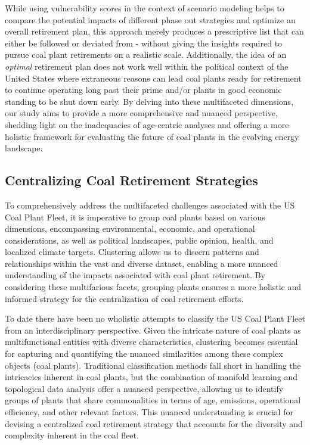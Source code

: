 While using vulnerability scores in the context of scenario modeling helps to compare the potential impacts of different phase out strategies and 
optimize an overall retirement plan, this approach merely produces a prescriptive list that can either be followed or deviated from - without giving 
the insights required to pursue coal plant retirements on a realistic scale. Additionally, the idea of an \textit{optimal} retirement plan does not work well 
within the political context of the United States where extraneous reasons can lead coal plants ready for retirement to continue operating long 
past their prime and/or plants in good economic standing to be shut down early. By delving into these multifaceted dimensions, our study aims to provide a 
more comprehensive and nuanced perspective, shedding light on the inadequacies of age-centric analyses and offering a more holistic 
framework for evaluating the future of coal plants in the evolving energy landscape.


\subsection{Centralizing Coal Retirement Strategies}


To comprehensively address the multifaceted challenges associated with the US Coal Plant Fleet, it is imperative to group coal plants based on various dimensions, 
encompassing environmental, economic, and operational considerations, as well as political landscapes, public opinion, health, and localized climate targets. Clustering allows us to discern patterns and relationships within the vast and diverse dataset, 
enabling a more nuanced understanding of the impacts associated with coal plant retirement. By considering these multifarious facets, grouping plants ensures a more 
holistic and informed strategy for the centralization of coal retirement efforts.

To date there have been no wholistic attempts to classify the US Coal Plant Fleet from an interdisciplinary perspective. Given the intricate nature of coal 
plants as multifunctional entities with diverse characteristics, clustering becomes essential for capturing and quantifying the nuanced similarities among these 
complex objects (coal plants). Traditional classification methods fall short in handling the intricacies inherent in coal plants, but the combination of manifold learning and topological data analysis offer 
a nuanced perspective, allowing us to identify groups of plants that share commonalities in terms of age, emissions, operational efficiency, and other relevant factors. 
This nuanced understanding is crucial for devising a centralized coal retirement strategy that accounts for the diversity and complexity inherent in the coal fleet.

